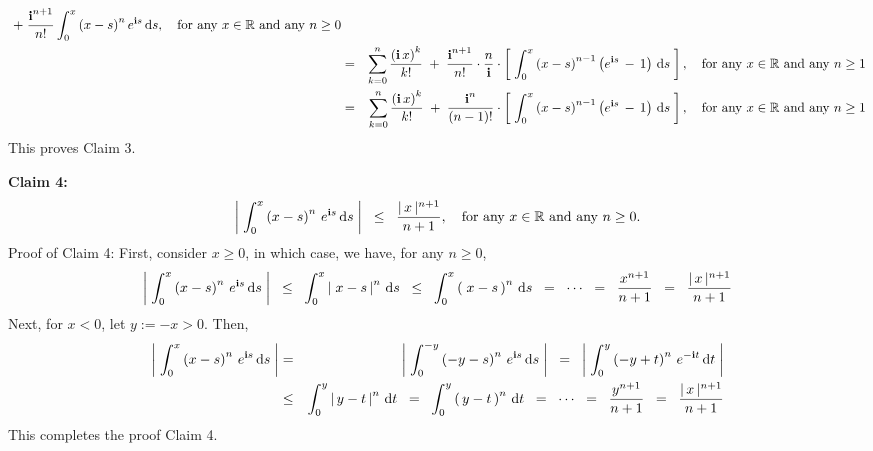 \begin{center}
\begin{minipage}{6.5in}
\begin{eqnarray*}
\;+\; \dfrac{\textnormal{\bf i}^{n+1}}{n!}\int_{0}^{x}\left(x-s\right)^{n}e^{\textnormal{\bf i} s}\,\textnormal{d} s,
\quad
\textnormal{for any $x \in \mathbb{R}$ and any $n \geq 0$}
\\
&=&
\sum_{k=0}^{n}\dfrac{\left(\textnormal{\bf i}\,x\right)^{k}}{k!}
\;+\; \dfrac{\textnormal{\bf i}^{n+1}}{n!}\cdot\frac{n}{\textnormal{\bf i}}\cdot
\left[\;
\int_{0}^{x}\left(x-s\right)^{n-1}\left(e^{\textnormal{\bf i} s}\,-\,1\right)\,\textnormal{d} s
\;\right],
\quad
\textnormal{for any $x \in \mathbb{R}$ and any $n \geq 1$}
\\
&=&
\sum_{k=0}^{n}\dfrac{\left(\textnormal{\bf i}\,x\right)^{k}}{k!}
\;+\; \dfrac{\textnormal{\bf i}^{n}}{(n-1)!}\cdot
\left[\;
\int_{0}^{x}\left(x-s\right)^{n-1}\left(e^{\textnormal{\bf i} s}\,-\,1\right)\,\textnormal{d} s
\;\right],
\quad
\textnormal{for any $x \in \mathbb{R}$ and any $n \geq 1$}
\end{eqnarray*}
This proves Claim 3.
\end{minipage}
\end{center}

\vskip 0.5cm

\begin{center}
\begin{minipage}{6.5in}
\noindent
\textbf{Claim 4:}
\begin{equation*}
\left\vert\;
\int_{0}^{x}\left(x-s\right)^{n}\,e^{\textnormal{\bf i} s}\,\textnormal{d} s
\;\right\vert
\;\; \leq \;\; \dfrac{\vert\,x\,\vert^{n+1}}{n+1},
\quad
\textnormal{for any $x \in \mathbb{R}$ and any $n \geq 0$.}
\end{equation*}
Proof of Claim 4:
First, consider $x \geq 0$, in which case, we have, for any $n \geq 0$,
\begin{equation*}
\left\vert\;
\int_{0}^{x}\left(x-s\right)^{n}\,e^{\textnormal{\bf i} s}\,\textnormal{d} s
\;\right\vert
\;\;\leq\;\; \int_{0}^{x}\left\vert\; x-s\,\right\vert^{n} \,\textnormal{d} s
\;\;\leq\;\; \int_{0}^{x}\left(\; x-s\,\right)^{n} \,\textnormal{d} s
\;\;=\;\; \cdots \;\;=\;\; \dfrac{x^{n+1}}{n+1} \;\;=\;\; \dfrac{\vert\,x\,\vert^{n+1}}{n+1}
\end{equation*}
Next, for $x < 0$, let $y := -x > 0$. Then,
\begin{eqnarray*}
\left\vert\;
\int_{0}^{x}\left(x-s\right)^{n}\,e^{\textnormal{\bf i} s}\,\textnormal{d} s
\;\right\vert
&=& \left\vert\; \int_{0}^{-y}\left(-y-s\right)^{n}\,e^{\textnormal{\bf i} s}\,\textnormal{d} s \;\right\vert
\;\;=\;\; \left\vert\; \int_{0}^{y}\left(-y+t\right)^{n}\,e^{-\textnormal{\bf i} t}\,\textnormal{d} t \;\right\vert
\\
&\leq& \int_{0}^{y}\left\vert\, y-t \,\right\vert^{n} \,\textnormal{d} t
\;\;=\;\; \int_{0}^{y}\left(\, y-t \,\right)^{n} \,\textnormal{d} t
\;\;=\;\; \cdots \;\;=\;\; \dfrac{y^{n+1}}{n+1} \;\;=\;\; \dfrac{\vert\,x\,\vert^{n+1}}{n+1}
\end{eqnarray*}
This completes the proof Claim 4.
\end{minipage}
\end{center}

